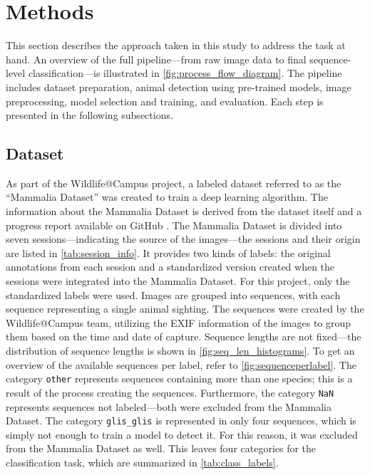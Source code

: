 

\section{Methods}
\label{methods}

This section describes the approach taken in this study to address the task at hand.
An overview of the full pipeline---from raw image data to final sequence-level classification---is illustrated in \autoref{fig:process_flow_diagram}.
The pipeline includes dataset preparation, animal detection using pre-trained models, image preprocessing, model selection and training, and evaluation.
Each step is presented in the following subsections.

\subsection{Dataset}
As part of the Wildlife@Campus project, a labeled dataset referred to as the \enquote{Mammalia Dataset} was created to train a deep learning algorithm.
The information about the Mammalia Dataset is derived from the dataset itself and a progress report available on GitHub \autocite{ratnaweeraWildlifeCampusProgressReports2021}.
The Mammalia Dataset is divided into seven sessions---indicating the source of the images---the sessions and their origin are listed in \autoref{tab:session_info}.
It provides two kinds of labels: the original annotations from each session and a standardized version created when the sessions were integrated into the Mammalia Dataset.
For this project, only the standardized labels were used.
Images are grouped into sequences, with each sequence representing a single animal sighting.
The sequences were created by the Wildlife@Campus team, utilizing the \ac{EXIF} information of the images to group them based on the time and date of capture.
Sequence lengths are not fixed---the distribution of sequence lengths is shown in \autoref{fig:seq_len_histograms}.
To get an overview of the available sequences per label, refer to \autoref{fig:sequenceperlabel}.
The category \texttt{other} represents sequences containing more than one species; this is a result of the process creating the sequences.
Furthermore, the category \texttt{NaN} represents sequences not labeled---both were excluded from the Mammalia Dataset.
The category \texttt{glis\_glis} is represented in only four sequences, which is simply not enough to train a model to detect it.
For this reason, it was excluded from the Mammalia Dataset as well.
This leaves four categories for the classification task, which are summarized in \autoref{tab:class_labels}.

